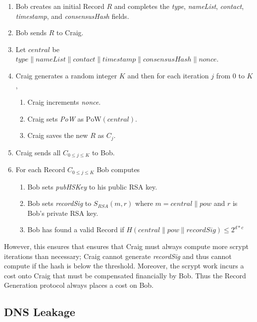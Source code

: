 \documentclass{sig-alternate}
\newcommand*\concat{\mathbin{\|}}
\begin{document}
\begin{enumerate}
	\item Bob creates an initial Record $ R $ and completes the \emph{type}, \emph{nameList}, \emph{contact}, \emph{timestamp}, and \emph{consensusHash} fields.
	\item Bob sends $ R $ to Craig.
	\item Let $ \mathit{central} $ be $\mathit{type} \concat \mathit{nameList} \concat \mathit{contact} \concat \mathit{timestamp} \concat \mathit{consensusHash} \concat \mathit{nonce} $.
	\item Craig generates a random integer $ K $ and then for each iteration $ j $ from 0 to $ K $,
		\begin{enumerate}
			\item Craig increments \emph{nonce}.
			\item Craig sets \emph{PoW} as $ \mathrm{PoW}(\mathit{central}) $.
			\item Craig saves the new $ R $ as $ C_{j} $.
		\end{enumerate}
	\item Craig sends all $ C_{0 \le j \le K} $ to Bob.
	\item For each Record $ C_{0 \le j \le K} $ Bob computes
		\begin{enumerate}
			\item Bob sets \emph{pubHSKey} to his public RSA key.
			\item Bob sets \emph{recordSig} to $ S_{\mathit{RSA}}(m, r) $ where $ m = \mathit{central} \concat \mathit{pow} $ and $ r $ is Bob's private RSA key.
			\item Bob has found a valid Record if $ H(\mathit{central} \concat \mathit{pow} \concat \mathit{recordSig}) \leq 2^{\mathit{d} * \mathit{c}} $
		\end{enumerate}
\end{enumerate}


However, this ensures that ensures that Craig must always compute more scrypt iterations than necessary; Craig cannot generate \emph{recordSig} and thus cannot compute if the hash is below the threshold. Moreover, the scrypt work incurs a cost onto Craig that must be compensated financially by Bob. Thus the Record Generation protocol always places a cost on Bob.

\subsection{DNS Leakage}
\end{document}
